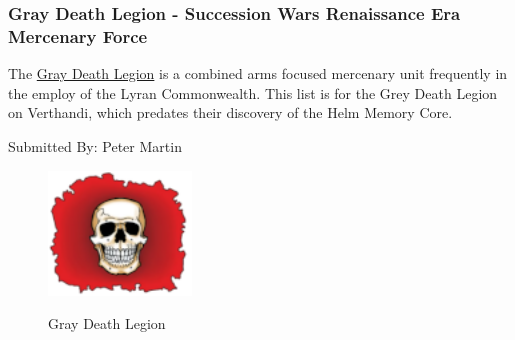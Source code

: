 \subsubsection{Gray Death Legion - Succession Wars Renaissance Era Mercenary Force}

The \href{https://www.sarna.net/wiki/Gray_Death_Legion}{Gray Death Legion} is a combined arms focused mercenary unit frequently in the employ of the Lyran Commonwealth.
This list is for the Grey Death Legion on Verthandi, which predates their discovery of the Helm Memory Core.

Submitted By: Peter Martin

\begin{figure}[!h]
  \centering
  \includegraphics[alt='Gray Death Legion Logo', width=1.5in, height=1.306in]{img/Gray-Death-Legion.png}
  \caption*{Gray Death Legion}
\end{figure}

